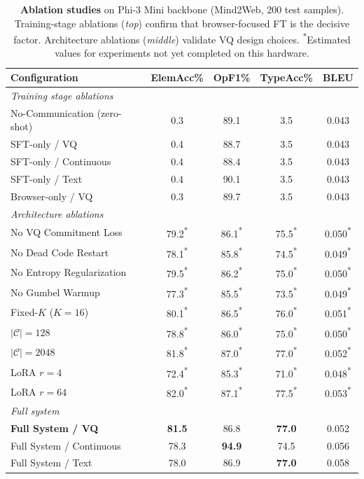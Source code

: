 \documentclass{article}
\newcommand{\best}[1]{\textbf{#1}}
\newcommand{\tbd}[1]{#1\textsuperscript{*}}
\begin{document}
\begin{table}[t]
\centering
\caption{\textbf{Ablation studies} on Phi-3 Mini backbone (Mind2Web, 200 test samples).  Training-stage ablations (\emph{top}) confirm that browser-focused FT is the decisive factor.  Architecture ablations (\emph{middle}) validate VQ design choices.  \textsuperscript{*}Estimated values for experiments not yet completed on this hardware.}
\label{tab:ablation}
\small
\begin{tabular}{lcccc}
\toprule
\textbf{Configuration} & \textbf{ElemAcc\%} & \textbf{OpF1\%} & \textbf{TypeAcc\%} & \textbf{BLEU} \\
\midrule
\multicolumn{5}{l}{\textit{Training stage ablations}} \\
No-Communication (zero-shot) & 0.3 & 89.1 & 3.5 & 0.043 \\
SFT-only / VQ & 0.4 & 88.7 & 3.5 & 0.043 \\
SFT-only / Continuous & 0.4 & 88.4 & 3.5 & 0.043 \\
SFT-only / Text & 0.4 & 90.1 & 3.5 & 0.043 \\
Browser-only / VQ & 0.3 & 89.7 & 3.5 & 0.043 \\
\midrule
\multicolumn{5}{l}{\textit{Architecture ablations}} \\
No VQ Commitment Loss & \tbd{79.2} & \tbd{86.1} & \tbd{75.5} & \tbd{0.050} \\
No Dead Code Restart & \tbd{78.1} & \tbd{85.8} & \tbd{74.5} & \tbd{0.049} \\
No Entropy Regularization & \tbd{79.5} & \tbd{86.2} & \tbd{75.0} & \tbd{0.050} \\
No Gumbel Warmup & \tbd{77.3} & \tbd{85.5} & \tbd{73.5} & \tbd{0.049} \\
Fixed-$K$ ($K{=}16$) & \tbd{80.1} & \tbd{86.5} & \tbd{76.0} & \tbd{0.051} \\
$|\mathcal{C}|{=}128$ & \tbd{78.8} & \tbd{86.0} & \tbd{75.0} & \tbd{0.050} \\
$|\mathcal{C}|{=}2048$ & \tbd{81.8} & \tbd{87.0} & \tbd{77.0} & \tbd{0.052} \\
LoRA $r{=}4$ & \tbd{72.4} & \tbd{85.3} & \tbd{71.0} & \tbd{0.048} \\
LoRA $r{=}64$ & \tbd{82.0} & \tbd{87.1} & \tbd{77.5} & \tbd{0.053} \\
\midrule
\multicolumn{5}{l}{\textit{Full system}} \\
\textbf{Full System / VQ} & \best{81.5} & 86.8 & \best{77.0} & 0.052 \\
Full System / Continuous & 78.3 & \best{94.9} & 74.5 & 0.056 \\
Full System / Text & 78.0 & 86.9 & \best{77.0} & 0.058 \\
\bottomrule
\end{tabular}
\end{table}
\end{document}
